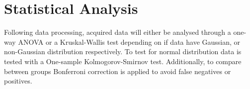 \section{Statistical Analysis} \label{sec:statistics}

Following data processing, acquired data will either be analysed through a one-way ANOVA or a Kruskal-Wallis test depending on if data have Gaussian, or non-Gaussian distribution respectively. To test for normal distribution data is tested with a One-sample Kolmogorov-Smirnov test. Additionally, to compare between groups Bonferroni correction is applied to avoid false negatives or positives. 



